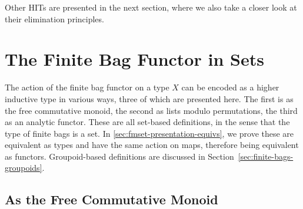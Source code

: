 \documentclass[a4paper,USenglish,cleveref]{lipics-v2021}
\begin{document}
Other HITs are presented in the next section, where we also take a closer look at their elimination principles.



\section{The Finite Bag Functor in Sets}\label{sec:finite-bags-sets}

The action of the finite bag functor on a type $X$ can be encoded as a higher inductive
type in various ways, three of which are presented here.
The first is as the free commutative monoid, the second as lists modulo permutations, the third as an analytic functor.
These are all set-based definitions, in the sense that the type of finite bags is a set.
In \cref{sec:fmset-presentation-equivs}, we prove these are equivalent as types and have the same action on maps,
therefore being equivalent as functors.
Groupoid-based definitions are discussed in Section~\ref{sec:finite-bags-groupoids}.

\subsection{As the Free Commutative Monoid}
\end{document}
